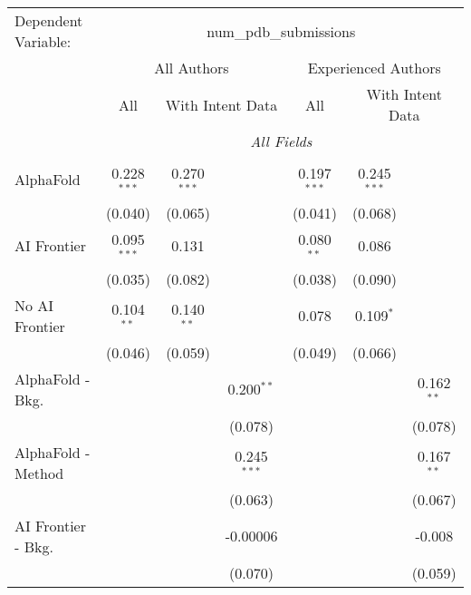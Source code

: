 \begingroup
\centering
\begin{tabular}{lcccccc}
   \tabularnewline \midrule \midrule
   Dependent Variable: & \multicolumn{6}{c}{num\_pdb\_submissions}\\
 & \multicolumn{3}{c}{All Authors} & \multicolumn{3}{c}{Experienced Authors} \\
\cmidrule(lr){2-4} \cmidrule(lr){5-7}
 & \multicolumn{1}{c}{All} & \multicolumn{2}{c}{With Intent Data} & \multicolumn{1}{c}{All} & \multicolumn{2}{c}{With Intent Data} \\
\cmidrule(lr){2-2} \cmidrule(lr){3-4} \cmidrule(lr){5-5} \cmidrule(lr){6-7}
 & \multicolumn{6}{c}{\textit{All Fields}} \\ \\
   AlphaFold               & 0.228$^{***}$ & 0.270$^{***}$ &               & 0.197$^{***}$ & 0.245$^{***}$ &   \\   
                           & (0.040)       & (0.065)       &               & (0.041)       & (0.068)       &   \\   
   AI Frontier             & 0.095$^{***}$ & 0.131         &               & 0.080$^{**}$  & 0.086         &   \\   
                           & (0.035)       & (0.082)       &               & (0.038)       & (0.090)       &   \\   
   No AI Frontier          & 0.104$^{**}$  & 0.140$^{**}$  &               & 0.078         & 0.109$^{*}$   &   \\   
                           & (0.046)       & (0.059)       &               & (0.049)       & (0.066)       &   \\   
   AlphaFold - Bkg.        &               &               & 0.200$^{**}$  &               &               & 0.162$^{**}$\\   
                           &               &               & (0.078)       &               &               & (0.078)\\   
   AlphaFold - Method      &               &               & 0.245$^{***}$ &               &               & 0.167$^{**}$\\   
                           &               &               & (0.063)       &               &               & (0.067)\\   
   AI Frontier - Bkg.      &               &               & -0.00006      &               &               & -0.008\\   
                           &               &               & (0.070)       &               &               & (0.059)\\   

\end{tabular}
